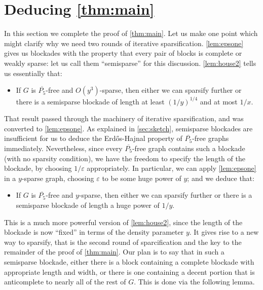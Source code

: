 \documentclass[11pt,reqno,a4paper]{amsart}
\newcommand{\eps}{\varepsilon}
\newcommand{\erh}{Erd\H{o}s-Hajnal}
\begin{document}
	\section{Deducing \cref{thm:main}}
	\label{sec:2ndround}
	In this section we complete the proof of \cref{thm:main}. 
	Let us make one point which might clarify why we need two rounds of iterative sparsification. \cref{lem:epsone} gives us blockades
	with the property that every pair of blocks is complete or weakly sparse: let us call them ``semisparse'' for this discussion.
	\cref{lem:house2} tells us essentially that:
	\begin{itemize}
		\item If $G$ is $\overline{P_5}$-free and $O(y^3)$-sparse, then either we can sparsify further or there is
		a semisparse blockade of length at least $(1/y)^{1/4}$ and at most $1/x$.
	\end{itemize}
	That result passed through the machinery of iterative sparsification, and was converted to \cref{lem:epsone}.
	As explained in \cref{sec:sketch}, semisparse blockades are insufficient for us to deduce the \erh{} property of $\overline{P_5}$-free graphs immediately.
	Nevertheless, since every $\overline{P_5}$-free graph contains such a blockade (with no sparsity
	condition), we have the freedom to specify the length of the blockade, by choosing $1/\eps$ appropriately.
	In particular, we can apply \cref{lem:epsone} in a $y$-sparse graph, choosing $\eps$ to be some huge power of $y$; and we deduce that:
	\begin{itemize}
		\item 
		If $G$ is $\overline{P_5}$-free and $y$-sparse, then either we can sparsify further or there is
		a semisparse blockade of length a huge power of $1/y$.
	\end{itemize}
	This is a much more powerful version of \cref{lem:house2}, since the length of the blockade is now ``fixed'' in terms of the density parameter $y$.
	It gives rise to a new way to sparsify, that is the second round of sparcification and the key to the remainder of the proof of \cref{thm:main}.
	Our plan is to say that in such a semisparse blockade, either there is a block containing a complete blockade with appropriate length and width, or there is one containing a decent portion that is anticomplete to nearly all of the rest of $G$.
	This is done via the following lemma.
\end{document}
